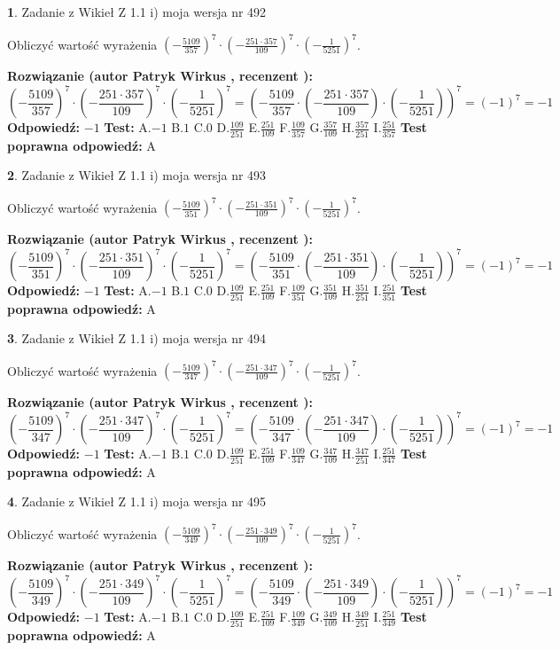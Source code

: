 \documentclass[12pt, a4paper]{article}
\theoremstyle{definition} %
\newtheorem{zad}{}
\newcommand{\zadStart}[1]{\begin{zad}#1\newline}
\newcommand{\zadStop}{\end{zad}}
\newcommand{\rozwStart}[2]{\noindent \textbf{Rozwiązanie (autor #1 , recenzent #2): }\newline}
\newcommand{\rozwStop}{\newline}
\newcommand{\odpStart}{\noindent \textbf{Odpowiedź:}\newline}
\newcommand{\odpStop}{\newline}
\newcommand{\testStart}{\noindent \textbf{Test:}\newline}
\newcommand{\testStop}{\newline}
\newcommand{\kluczStart}{\noindent \textbf{Test poprawna odpowiedź:}\newline}
\newcommand{\kluczStop}{\newline}
\begin{document}
\zadStart{Zadanie z Wikieł Z 1.1 i) moja wersja nr 492}

Obliczyć wartość wyrażenia $(-\frac{5109}{357})^{7} \cdot (-\frac{251 \cdot 357}{109})^{7} \cdot (-\frac{1}{5251})^{7}$.
\zadStop
\rozwStart{Patryk Wirkus}{}
$$(-\frac{5109}{357})^{7} \cdot (-\frac{251 \cdot 357}{109})^{7} \cdot (-\frac{1}{5251})^{7} = (-\frac{5109}{357} \cdot (-\frac{251 \cdot 357}{109}) \cdot (-\frac{1}{5251}))^{7} = (-1)^{7} = -1$$
\rozwStop
\odpStart
$-1$
\odpStop
\testStart
A.$-1$ B.$1$ C.$0$ D.$\frac{109}{251}$ E.$\frac{251}{109}$
F.$\frac{109}{357}$ G.$\frac{357}{109}$
H.$\frac{357}{251}$
I.$\frac{251}{357}$
\testStop
\kluczStart
A
\kluczStop



\zadStart{Zadanie z Wikieł Z 1.1 i) moja wersja nr 493}

Obliczyć wartość wyrażenia $(-\frac{5109}{351})^{7} \cdot (-\frac{251 \cdot 351}{109})^{7} \cdot (-\frac{1}{5251})^{7}$.
\zadStop
\rozwStart{Patryk Wirkus}{}
$$(-\frac{5109}{351})^{7} \cdot (-\frac{251 \cdot 351}{109})^{7} \cdot (-\frac{1}{5251})^{7} = (-\frac{5109}{351} \cdot (-\frac{251 \cdot 351}{109}) \cdot (-\frac{1}{5251}))^{7} = (-1)^{7} = -1$$
\rozwStop
\odpStart
$-1$
\odpStop
\testStart
A.$-1$ B.$1$ C.$0$ D.$\frac{109}{251}$ E.$\frac{251}{109}$
F.$\frac{109}{351}$ G.$\frac{351}{109}$
H.$\frac{351}{251}$
I.$\frac{251}{351}$
\testStop
\kluczStart
A
\kluczStop



\zadStart{Zadanie z Wikieł Z 1.1 i) moja wersja nr 494}

Obliczyć wartość wyrażenia $(-\frac{5109}{347})^{7} \cdot (-\frac{251 \cdot 347}{109})^{7} \cdot (-\frac{1}{5251})^{7}$.
\zadStop
\rozwStart{Patryk Wirkus}{}
$$(-\frac{5109}{347})^{7} \cdot (-\frac{251 \cdot 347}{109})^{7} \cdot (-\frac{1}{5251})^{7} = (-\frac{5109}{347} \cdot (-\frac{251 \cdot 347}{109}) \cdot (-\frac{1}{5251}))^{7} = (-1)^{7} = -1$$
\rozwStop
\odpStart
$-1$
\odpStop
\testStart
A.$-1$ B.$1$ C.$0$ D.$\frac{109}{251}$ E.$\frac{251}{109}$
F.$\frac{109}{347}$ G.$\frac{347}{109}$
H.$\frac{347}{251}$
I.$\frac{251}{347}$
\testStop
\kluczStart
A
\kluczStop



\zadStart{Zadanie z Wikieł Z 1.1 i) moja wersja nr 495}

Obliczyć wartość wyrażenia $(-\frac{5109}{349})^{7} \cdot (-\frac{251 \cdot 349}{109})^{7} \cdot (-\frac{1}{5251})^{7}$.
\zadStop
\rozwStart{Patryk Wirkus}{}
$$(-\frac{5109}{349})^{7} \cdot (-\frac{251 \cdot 349}{109})^{7} \cdot (-\frac{1}{5251})^{7} = (-\frac{5109}{349} \cdot (-\frac{251 \cdot 349}{109}) \cdot (-\frac{1}{5251}))^{7} = (-1)^{7} = -1$$
\rozwStop
\odpStart
$-1$
\odpStop
\testStart
A.$-1$ B.$1$ C.$0$ D.$\frac{109}{251}$ E.$\frac{251}{109}$
F.$\frac{109}{349}$ G.$\frac{349}{109}$
H.$\frac{349}{251}$
I.$\frac{251}{349}$
\testStop
\kluczStart
A
\kluczStop
\end{document}
